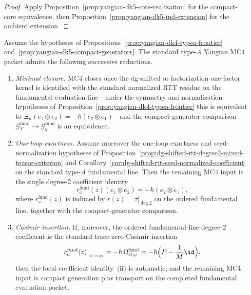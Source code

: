 \begin{proof}
Apply Proposition~\ref{prop:yangian-dk5-core-realization} for the
compact-core equivalence, then
Proposition~\ref{prop:yangian-dk5-ind-extension} for the ambient
extension.
\end{proof}

\begin{corollary}
\label{cor:yangian-typea-mc4-closure-criterion}%
\label{cor:yangian-typea-degree2-plus-generators}%
\label{cor:yangian-typea-casimir-plus-generators}%
\label{cor:yangian-typea-factorization-local-closure}%
\label{cor:yangian-typea-shared-seed-plus-generators}%
Assume the hypotheses of
Propositions~\ref{prop:yangian-dk4-typea-frontier}
and~\ref{prop:yangian-dk5-compact-generators}.
The standard type-$A$ Yangian MC4 packet admits the following
successive reductions.
\begin{enumerate}[label=\textup{(\roman*)}]
\item\emph{Minimal closure.}
  MC4 closes once the dg-shifted or factorization one-factor kernel is
  identified with the standard normalized RTT residue on the
  fundamental evaluation line---under the symmetry and normalization
  hypotheses of
  Proposition~\ref{prop:yangian-dk4-typea-frontier} this is equivalent
  to
  \(
  \Xi_a(e_1\otimes e_2)=-\hbar(e_2\otimes e_1)
  \)---and the compact-generator comparison
  $\mathcal{G}^{\mathrm{fund}}_Y \to \mathcal{G}^{\mathrm{fund}}_q$
  is an equivalence.

\item\emph{One-loop exactness.}
  Assume moreover the one-loop exactness and seed-normalization
  hypotheses of
  Proposition~\ref{prop:dg-shifted-rtt-degree2-mixed-tensor-criterion}
  and
  Corollary~\ref{cor:dg-shifted-rtt-seed-normalized-coefficient} on
  the standard type-$A$ fundamental line.  Then the remaining MC4
  input is the single degree-$2$ coefficient identity
  \[
  r_a^{\mathrm{fund}}(z)(e_1\otimes e_2)
  =
  -\hbar(e_2\otimes e_1),
  \]
  where $r_a^{\mathrm{fund}}(z)$ is induced by
  $r(z)=\tau|_{\deg 2}$ on the ordered fundamental line, together
  with the compact-generator comparison.

\item\emph{Casimir insertion.}
  If, moreover, the ordered fundamental-line degree-$2$ coefficient is
  the standard trace-zero Casimir insertion
  \[
  r_a^{\mathrm{fund}}(z)\big|_{z_1=z_2}
  =
  -\hbar\,\Omega_{\mathfrak{sl}_M}^{\mathrm{fund}}
  =
  -\hbar\Bigl(P-\frac{1}{M}\id\Bigr),
  \]
  then the local coefficient identity~\textup{(ii)} is automatic, and
  the remaining MC4 input is compact generation plus transport on the
  completed fundamental evaluation packet.


\end{enumerate}
\end{corollary}
